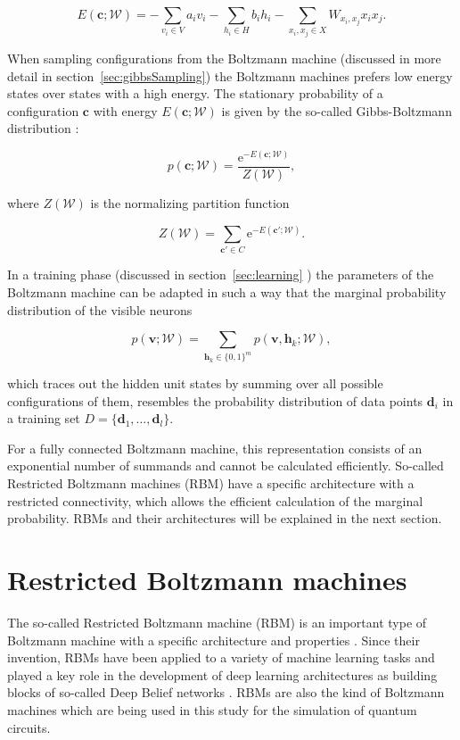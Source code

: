 \begin{equation}
  E(\bm{c};\mathcal{W}) = - \sum_{v_i \in V} a_{i}v_{i} - \sum_{h_i \in H} b_{i}h_{i} - \sum_{x_i,x_j \in X} W_{x_i,x_j}x_{i}x_{j}.
\end{equation}

When sampling configurations from the Boltzmann machine (discussed in more detail in section~\ref{sec:gibbsSampling}) the 
Boltzmann machines prefers low energy states over states with a high energy. The stationary probability
of a configuration $\bm{c}$ with energy $E(\bm{c};\mathcal{W})$ is given by the so-called Gibbs-Boltzmann distribution \cite{gibbs_2010}:

\begin{equation}
   p(\bm{c};\mathcal{W}) = \frac{\mathrm{e}^{-E(\bm{c};\mathcal{W})}}{Z(\mathcal{W})},
\end{equation}

where $Z(\mathcal{W})$ is the normalizing partition function 

\begin{equation}
   Z(\mathcal{W}) = \sum_{\bm{c}\prime\in C} \mathrm{e}^{-E(\bm{c}\prime;\mathcal{W})}.
\end{equation}

In a training phase (discussed in section~\ref{sec:learning} ) the parameters of the Boltzmann machine can be adapted in such a way that 
the marginal probability distribution of the visible neurons

\begin{equation}
    \label{eq:gbm}
   p(\bm{v};\mathcal{W}) = \sum_{\bm{h}_k \in \{0,1\}^m} p(\bm{v},\bm{h}_k;\mathcal{W}),
\end{equation}

which traces out the hidden unit 
states by summing over all possible configurations of them, resembles the probability 
distribution of data points $\bm{d}_i$ in a training set $D=\{\bm{d}_1,\dots,\bm{d}_l\}$.

For a fully connected Boltzmann machine, this representation consists of an exponential number of summands and cannot be calculated efficiently. So-called Restricted Boltzmann machines
(RBM) have a specific architecture with a restricted connectivity, which allows the efficient calculation of the marginal probability. RBMs and their architectures will be explained in the next section.

\section{Restricted Boltzmann machines}
The so-called Restricted Boltzmann machine (RBM) is an important type of Boltzmann machine with 
a specific architecture and properties \cite{smolensky1986information}. Since their invention, RBMs have been applied to a variety 
of machine learning tasks and played a 
key role in the development of deep learning architectures as building blocks of so-called 
Deep Belief networks \cite{bengio2009learning, hinton2006fast}.
RBMs are also the kind of Boltzmann machines which are being used in this study for the simulation 
of quantum circuits.

